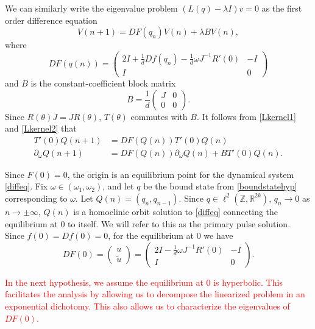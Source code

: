 \documentclass[12pt]{elsarticle}
\def\R{{\mathbb R}}
\def\Z{{\mathbb Z}}
\newcommand{\revised}[1]{ \textcolor{red}{#1} }
\begin{document}
We can similarly write the eigenvalue problem $(L(q) - \lambda I)v = 0$ as the first order difference equation 
\begin{equation}\label{latticeEVP}
V(n+1) = DF(q_n) V(n) + \lambda B V(n),
\end{equation}
where
\begin{equation}\label{latticeDF}
DF(q(n)) = 
\begin{pmatrix}
2I + \frac{1}{d}Df(q_n) -\frac{1}{d}\omega J^{-1} R'(0) & -I \\
I & 0
\end{pmatrix} 
\end{equation}
and $B$ is the constant-coefficient block matrix
\begin{equation}\label{latticeB}
B = \frac{1}{d} 
\begin{pmatrix}
J & 0 \\
0 & 0 
\end{pmatrix}.
\end{equation}
Since $R(\theta)J = J R(\theta)$, $T(\theta)$ commutes with $B$. It follows from \cref{Lkernel1} and \cref{Lkernel2} that
\begin{align}
T'(0) Q(n+1) &= DF(Q(n)) T'(0) Q(n) \label{DFkernel1} \\
\partial_\omega Q(n+1) &= DF(Q(n)) \partial_\omega Q(n) + B T'(0)Q(n) \label{DFkernel2}.
\end{align}

Since $F(0) = 0$, the origin is an equilibrium point for the dynamical system \cref{diffeq}. Fix $\omega \in (\omega_1, \omega_2)$, and let $q$ be the bound state from \cref{boundstatehyp} corresponding to $\omega$. Let $Q(n) = ( q_n, q_{n-1} )$. Since $q \in \ell^2(\Z, \R^{2k})$, $q_n \rightarrow 0$ as $n \rightarrow \pm \infty$, $Q(n)$ is a homoclinic orbit solution to \cref{diffeq} connecting the equilibrium at 0 to itself. We will refer to this as the primary pulse solution. Since $f(0) = Df(0) = 0$, for the equilibrium at 0 we have
\begin{equation}\label{DF0}
DF(0) = \begin{pmatrix}u \\ \tilde{u} \end{pmatrix} =
\begin{pmatrix}
2I - \frac{1}{d}\omega J^{-1} R'(0) & -I  \\
I & 0
\end{pmatrix}.
\end{equation}

\revised{In the next hypothesis, we assume the equilibrium at 0 is hyperbolic. This facilitates the analysis by allowing us to decompose the linearized problem in an exponential dichotomy. This also allows us to characterize the eigenvalues of $DF(0)$.}
\end{document}
